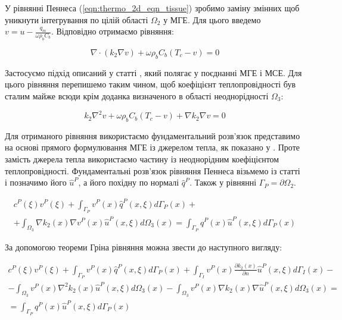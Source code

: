 У рівнянні Пеннеса (\ref{eqn:thermo_2d_eqn_tissue}) зробимо заміну змінних щоб уникнути інтегрування по цілій області 
$\Omega_2$ у МГЕ. Для цього введемо $v = u - \frac{q_m}{\omega \rho_b C_b}$. Відповідно отримаємо рівняння:

\begin{equation*}
    \nabla \cdot (k_2\nabla{v}) + \omega \rho_b C_b (T_c - v) = 0
\end{equation*}

Застосуємо підхід описаний у статті \cite{personal-bem-thermo}, який полягає у поєднанні МГЕ і МСЕ. Для цього рівняння
перепишемо таким чином, щоб коефіцієнт теплопровідності був сталим майже всюди крім доданка визначеного в 
області неоднорідності $\Omega_3$:  

\begin{equation*}
    k_2\nabla^2{v} + \omega \rho_b C_b (T_c - v) + \nabla{k_2}\nabla{v} = 0
\end{equation*}

Для отриманого рівняння використаємо фундаментальний розв'язок представимо на основі прямого формулювання МГЕ із 
джерелом тепла, як показано у \cite{brebbia-bem}. Проте замість джерела тепла використаємо частину із неоднорідним 
коефіцієнтом теплопровідності. Фундаментальні розв'язок рівняння Пеннеса візьмемо із статті 
\cite{pennes-equation-bem-fundamental-solutions} і позначимо його $\hat{u}^P$, а його похідну по нормалі $\hat{q}^P$. 
Також у рівнянні $\Gamma_P = \partial \Omega_2$.

\begin{equation*}
    \begin{split}
    c^P(\xi)v^P(\xi) + \int_{\Gamma_P}v^P(x)\hat{q}^P(x,\xi)d\Gamma_P(x) + \\ 
        + \int_{\Omega_3} \nabla{k_2(x)}\nabla{v^P(x)} \hat{u}^P(x,\xi) d \Omega_3(x) = 
        \int_{\Gamma_P}q^P(x)\hat{u}^P(x,\xi)d\Gamma_P(x)
    \end{split}
\end{equation*}

За допомогою теореми Гріна рівняння можна звести до наступного вигляду:

\begin{equation}
    \label{eqn:thermo_2d_bem_direct_pennes}
    \begin{split}
    c^P(\xi)v^P(\xi) + \int_{\Gamma_P}v^P(x)\hat{q}^P(x,\xi)d\Gamma_P(x) 
        +  \int_{\Gamma_I} v^P(x) \frac{\partial{k_2(x)}}{\partial{n}} \hat{u}^P(x,\xi) d \Gamma_I(x) - \\
        - \int_{\Omega_3}v^P(x) \nabla^2 k_2(x) \hat{u}^P(x,\xi) d\Omega_3(x) 
        - \int_{\Omega_3}v^P(x) \nabla k_2(x) \nabla \hat{u}^P(x,\xi) d\Omega_3(x) = \\
        = \int_{\Gamma_P}q^P(x)\hat{u}^P(x,\xi)d\Gamma_P(x)
    \end{split}
\end{equation}

